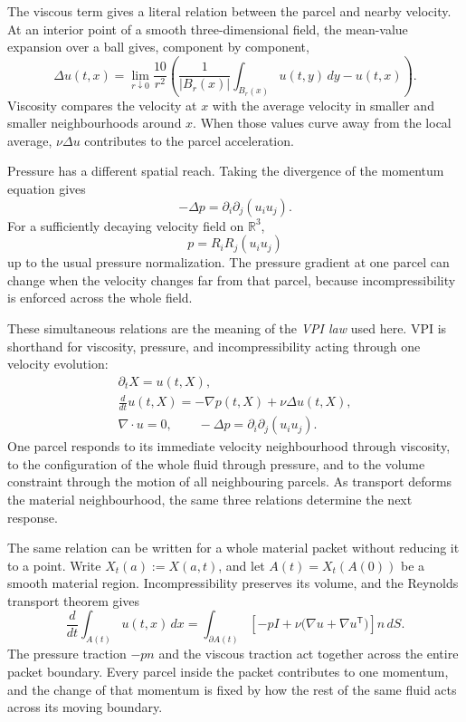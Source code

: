The viscous term gives a literal relation between the parcel and nearby velocity.
At an interior point of a smooth three-dimensional field, the mean-value expansion over a ball gives, component by component,
\[
  \Delta u(t,x)
  =
  \lim_{r\downarrow0}
  \frac{10}{r^2}
  \left(
    \frac{1}{|B_r(x)|}
    \int_{B_r(x)}u(t,y)\,dy
    -
    u(t,x)
  \right).
\]
Viscosity compares the velocity at \(x\) with the average velocity in smaller and smaller neighbourhoods around \(x\).
When those values curve away from the local average, \(\nu\Delta u\) contributes to the parcel acceleration.

Pressure has a different spatial reach.
Taking the divergence of the momentum equation gives
\[
  -\Delta p
  =
  \partial_i\partial_j(u_i u_j).
\]
For a sufficiently decaying velocity field on \(\mathbb R^3\),
\[
  p
  =
  R_iR_j(u_i u_j)
\]
up to the usual pressure normalization.
The pressure gradient at one parcel can change when the velocity changes far from that parcel, because incompressibility is enforced across the whole field.

These simultaneous relations are the meaning of the \emph{VPI law} used here.
VPI is shorthand for viscosity, pressure, and incompressibility acting through one velocity evolution:
\[
  \begin{gathered}
  \partial_tX=u(t,X),\\
  \frac{d}{dt}u(t,X)
  =
  -\nabla p(t,X)
  +
  \nu\Delta u(t,X),\\
  \nabla\cdot u=0,
  \qquad
  -\Delta p=\partial_i\partial_j(u_i u_j).
  \end{gathered}
\]
One parcel responds to its immediate velocity neighbourhood through viscosity, to the configuration of the whole fluid through pressure, and to the volume constraint through the motion of all neighbouring parcels.
As transport deforms the material neighbourhood, the same three relations determine the next response.

The same relation can be written for a whole material packet without reducing it to a point.
Write \(X_t(a):=X(a,t)\), and let \(A(t)=X_t(A(0))\) be a smooth material region.
Incompressibility preserves its volume, and the Reynolds transport theorem gives
\[
  \frac{d}{dt}\int_{A(t)}u(t,x)\,dx
  =
  \int_{\partial A(t)}
  \left[
    -pI
    +
    \nu\bigl(\nabla u+\nabla u^{\mathsf T}\bigr)
  \right]n\,dS.
\]
The pressure traction \(-pn\) and the viscous traction act together across the entire packet boundary.
Every parcel inside the packet contributes to one momentum, and the change of that momentum is fixed by how the rest of the same fluid acts across its moving boundary.

